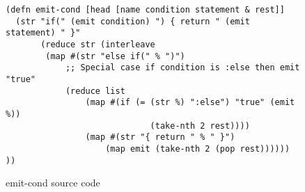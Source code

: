 
\begin{figure}[ht]
\begin{verbatim}
(defn emit-cond [head [name condition statement & rest]]
  (str "if(" (emit condition) ") { return " (emit statement) " }"
       (reduce str (interleave 
        (map #(str "else if(" % ")")
            ;; Special case if condition is :else then emit "true"
            (reduce list 
                (map #(if (= (str %) ":else") "true" (emit %))
                             (take-nth 2 rest))))
                (map #(str "{ return " % " }")
                    (map emit (take-nth 2 (pop rest)))))) ))
\end{verbatim}
\caption{emit-cond source code}
\end{figure}
